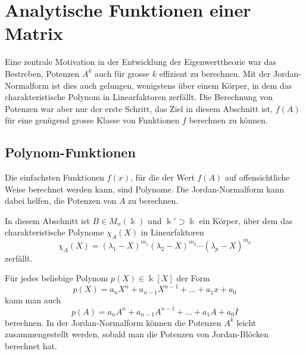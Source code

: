 %
%
%
\section{Analytische Funktionen einer Matrix
\label{buch:section:analytische-funktionen-einer-matrix}}
Eine zentrale Motivation in der Entwicklung der Eigenwerttheorie
war das Bestreben, Potenzen $A^k$ auch für grosse $k$ effizient
zu berechnen.
Mit der Jordan-Normalform ist dies auch gelungen, wenigstens über
einem Körper, in dem das charakteristische Polynom in Linearfaktoren
zerfällt.
Die Berechnung von Potenzen war aber nur der erste Schritt, das Ziel
in diesem Abschnitt ist, $f(A)$ für eine genügend grosse Klasse von
Funktionen $f$ berechnen zu können.

%
%
\subsection{Polynom-Funktionen
\label{buch:subsection:polynom-funktionen}}
Die einfachsten Funktionen $f(x)$, für die der Wert $f(A)$ 
auf offensichtliche Weise berechnet werden kann, sind Polynome.
Die Jordan-Normalform kann dabei helfen, die Potenzen von $A$
zu berechnen.

In diesem Abschnitt ist $B\in M_n(\Bbbk)$ und $\Bbbk'\supset\Bbbk$ ein
Körper, über dem das charakteristische Polynome $\chi_A(X)$ in
Linearfaktoren
\[
\chi_A(X)
=
(\lambda_1-X)^{m_1}(\lambda_2-X)^{m_2}\cdots(\lambda_p-X)^{m_p}
\]
zerfällt.

Für jedes beliebige Polynom $p(X)\in\Bbbk[X]$ der Form
\[
p(X) = a_nX^n + a_{n-1}X^{n-1} + \dots + a_1x + a_0
\]
kann man auch
\[
p(A) = a_nA^n + a_{n-1}A^{n-1} + \dots + a_1A + a_0I
\]
berechnen.
In der Jordan-Normalform können die Potenzen $A^k$ leicht zusammengestellt
werden, sobald man die Potenzen von Jordan-Blöcken berechnet hat.


